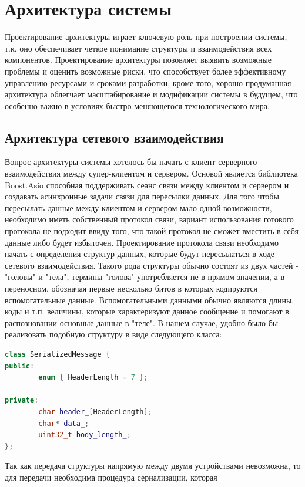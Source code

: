 \documentclass[a4paper, 14pt]{extreport}
\begin{document}
\section{Архитектура системы}
\par Проектирование архитектуры играет ключевую роль при построении системы, т.к. оно обеспечивает четкое понимание структуры и 
взаимодействия всех компонентов. Проектирование архитектуры позовляет выявить возможные проблемы и оценить возможные риски, что 
способствует более эффективному управлению ресурсами и сроками разработки, кроме того, хорошо продуманная архитектура облегчает 
масштабирование и модификации системы в будущем, что особенно важно в условиях быстро меняющегося технологического мира.
\subsection{Архитектура сетевого взаимодействия}
\par Вопрос архитектуры системы хотелось бы начать с клиент серверного взаимодействия между супер-клиентом и сервером. Основой является
библиотека Boost.Asio способная поддерживать сеанс связи между клиентом и сервером и создавать асинхронные задачи связи для пересылки 
данных. Для того чтобы пересылать данные между клиентом и сервером мало одной возможности, необходимо иметь собственный протокол связи,
вариант использования готового протокола не подходит ввиду того, что такой протокол не сможет вместить в себя данные либо будет 
избыточен. Проектирование протокола связи необходимо начать с определения структур данных, которые будут пересылаться в ходе сетевого 
взаимодействия. Такого рода структуры обычно состоят из двух частей - "головы" и "тела", термины "голова" употребляется не в прямом 
значении, а в переносном, обозначая первые несколько битов в которых кодируются вспомогательные данные. Вспомогательными данными 
обычно являются длины, коды и т.п. величины, которые характеризуют данное сообщение и помогают в распозновании основные данные в "теле".
В нашем случае, удобно было бы реализовать подобную структуру в виде следующего класса:
\begin{lstlisting}[language=C++, frame=single, xleftmargin=15pt, caption={Структура данных "сообщение"},label=DescriptiveLabel]
class SerializedMessage {
public:
        enum { HeaderLength = 7 };
        
private:
        char header_[HeaderLength];
        char* data_;
        uint32_t body_length_;
};
\end{lstlisting}
\par Так как передача структуры напрямую между двумя устройствами невозможна, то для передачи необходима процедура сериализации, которая
\end{document}
